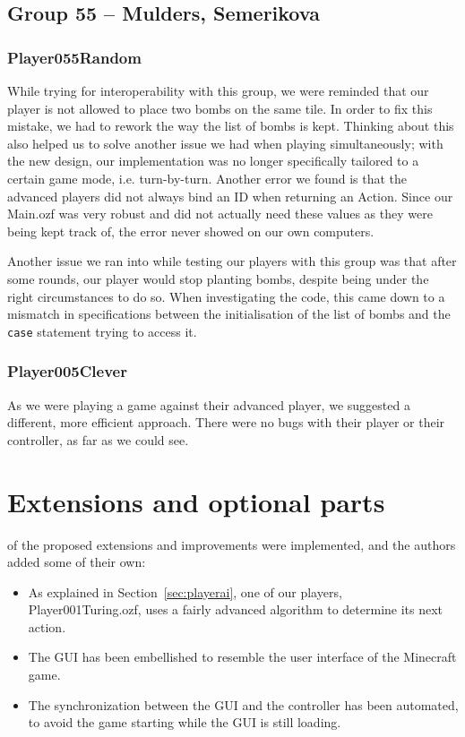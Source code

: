 \documentclass[12pt,journal]{IEEEtran}
\newcommand{\ntt}{\normalfont\ttfamily}
\newcommand{\fn}[1]{{\protect\ntt#1}}
\begin{document}
\subsection{Group 55 -- Mulders, Semerikova}
\subsubsection{\fn{Player055Random}}
While trying for interoperability with this group, we were reminded that our player is not allowed to place two bombs on the same tile.
In order to fix this mistake, we had to rework the way the list of bombs is kept.
Thinking about this also helped us to solve another issue we had when playing simultaneously; with the new design, our implementation was no longer specifically tailored to a certain game mode, i.e. turn-by-turn.
Another error we found is that the advanced players did not always bind an ID when returning an Action.
Since our \fn{Main.ozf} was very robust and did not actually need these values as they were being kept track of, the error never showed on our own computers.

Another issue we ran into while testing our players with this group was that after some rounds, our player would stop planting bombs, despite being under the right circumstances to do so.
When investigating the code, this came down to a mismatch in specifications between the initialisation of the list of bombs and the \lstinline|case| statement trying to access it.

\subsubsection{\fn{Player005Clever}}
As we were playing a game against their advanced player, we suggested a different, more efficient approach.
There were no bugs with their player or their controller, as far as we could see.


\section{Extensions and optional parts}
 of the proposed extensions and improvements were implemented, and the authors added some of their own:
\begin{itemize}
	\item As explained in Section~\ref{sec:playerai}, one of our players,
	\fn{Player001Turing.ozf}, uses a fairly advanced algorithm to determine its next action.
	\item The GUI has been embellished to resemble the user interface of the Minecraft game.
	\item The synchronization between the GUI and the controller has been automated, to avoid the game starting while the GUI is still loading.
\end{itemize}
\end{document}
